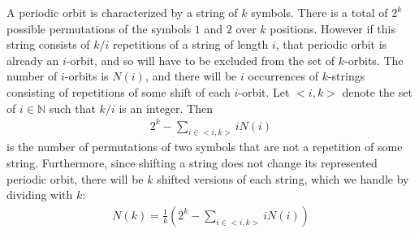 \begin{solution}[7.1]
A periodic orbit is characterized by a string of $k$ symbols. There is a total of $2^k$ possible permutations of the symbols $1$ and $2$ over $k$ positions. However if this string consists of $k/i$ repetitions of a string of length $i$, that periodic orbit is already an $i$-orbit, and so will have to be excluded from the set of $k$-orbits. The number of $i$-orbits is $N(i)$, and there will be $i$ occurrences of $k$-strings consisting of repetitions of some shift of each $i$-orbit. Let $<i,k>$ denote the set of $i \in \mathbb{N}$ such that $k/i$ is an integer. Then 
\begin{align}
    2^k - \sum_{i \in <i,k>} i N(i)
\end{align}
is the number of permutations of two symbols that are not a repetition of some string. Furthermore, since shifting a string does not change its represented periodic orbit, there will be $k$ shifted versions of each string, which we handle by dividing with $k$:
\begin{align}
    N(k) = \frac{1}{k}\left(2^k - \sum_{i \in <i,k>} i N(i) \right)
\end{align}

\end{solution}

